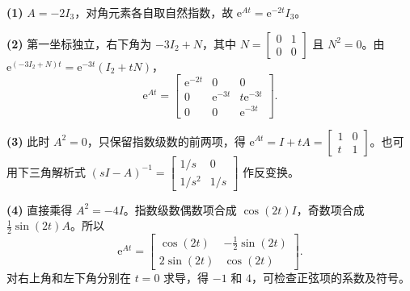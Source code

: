 

\sol \textbf{(1)} $A=-2I_3$，对角元素各自取自然指数，故 $\mathrm e^{At}=\mathrm e^{-2t}I_3$。

\textbf{(2)} 第一坐标独立，右下角为 $-3I_2+N$，其中 $N=\begin{bmatrix}0&1\\0&0\end{bmatrix}$ 且 $N^2=0$。由 $\mathrm e^{(-3I_2+N)t}=\mathrm e^{-3t}(I_2+tN)$，
\[
\mathrm e^{At}=\begin{bmatrix}
\mathrm e^{-2t}&0&0\\
0&\mathrm e^{-3t}&t\mathrm e^{-3t}\\
0&0&\mathrm e^{-3t}
\end{bmatrix}.
\]

\textbf{(3)} 此时 $A^2=0$，只保留指数级数的前两项，得 $\mathrm e^{At}=I+tA=\begin{bmatrix}1&0\\ t&1\end{bmatrix}$。也可用下三角解析式 $(sI-A)^{-1}=\begin{bmatrix}1/s&0\\1/s^2&1/s\end{bmatrix}$ 作反变换。

\textbf{(4)} 直接乘得 $A^2=-4I$。指数级数偶数项合成 $\cos(2t)I$，奇数项合成 $\tfrac12\sin(2t)A$。所以
\[
\mathrm e^{At}=\begin{bmatrix}
\cos(2t)&-\tfrac12\sin(2t)\\2\sin(2t)&\cos(2t)
\end{bmatrix}.
\]
对右上角和左下角分别在 $t=0$ 求导，得 $-1$ 和 $4$，可检查正弦项的系数及符号。

